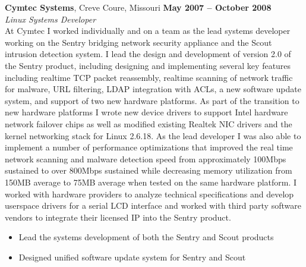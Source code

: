 \documentclass[margin,line]{resume}
\begin{document}
\begin{resume}
\textbf{Cymtec Systems}, Creve Coure, Missouri \hfill \textbf{May 2007 -- October 2008}\vspace{1mm}\\\vspace{1mm}%
\textit{\small{Linux Systems Developer}}\vspace{1mm}\\\vspace{0mm}%
At Cymtec I worked individually and on a team as the lead systems developer
working on the Sentry bridging network security appliance and the Scout intrusion
detection system. I lead the design and development of version 2.0 of the
Sentry product, including designing and implementing several key features
including realtime TCP packet reassembly, realtime scanning of network traffic
for malware, URL filtering, LDAP integration with ACLs, a new software update
system, and support of two new hardware platforms. As part of the transition to
new hardware platforms I wrote new device drivers to support Intel hardware
network failover chips as well as modified existing Realtek NIC drivers and the
kernel networking stack for Linux 2.6.18. As the lead developer I was also able
to implement a number of performance optimizations that improved the real time
network scanning and malware detection speed from approximately 100Mbps
sustained to over 800Mbps sustained while decreasing memory utilization from
150MB average to 75MB average when tested on the same hardware platform. I
worked with hardware providers to analyze technical specifications and develop
userspace drivers for a serial LCD interface and worked with third party
software vendors to integrate their licensed IP into the Sentry product.
\vspace{1mm}\\\vspace{0mm}
\begin{itemize}
\item Lead the systems development of both the Sentry and Scout products
\item Designed unified software update system for Sentry and Scout

\end{itemize}
\end{resume}
\end{document}
